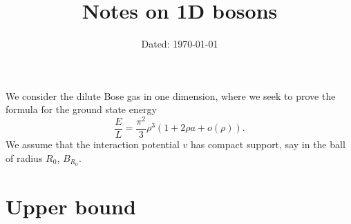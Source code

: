 \documentclass[a4paper,11pt]{article}
\author{}
\date{Dated: \today}
\title{Notes on 1D bosons}
\newcommand{\abs}[1]{\left\lvert #1 \right\rvert}
\newcommand{\ie}{\emph{i.e.} }
\newcommand{\R}{\mathbb{R}}
\newcommand{\rr}{\mathcal{R}}
\numberwithin{equation}{section}
\begin{document}
	\maketitle
	We consider the dilute Bose gas in one dimension, where we seek to prove the formula for the ground state energy \begin{equation}\label{EqGroundstateE}
	\frac{E}{L}=\frac{\pi^2}{3}\rho^3\left(1+2\rho a+ o\left(\rho \right)\right).
	\end{equation} 
	We assume that the interaction potential $ v $ has compact support, say in the ball of radius $ R_0 $, $ B_{R_0} $.
	\section{Upper bound}
\end{document}
